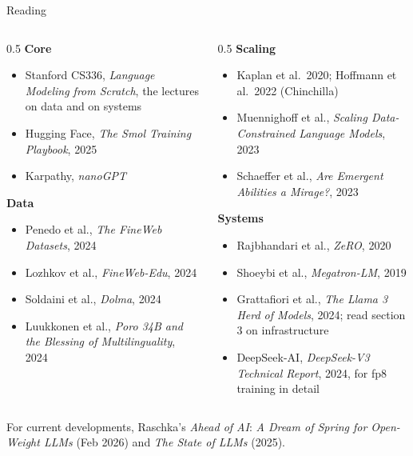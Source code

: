 \documentclass[aspectratio=169,10pt]{beamer}
\begin{document}
\begin{frame}[shrink=18]{Reading}
  \begin{columns}[T]
    \begin{column}{0.5\textwidth}
      \textbf{Core}
      \begin{itemize}\small
        \item Stanford CS336, \textit{Language Modeling from Scratch}, the
          lectures on data and on systems
        \item Hugging Face, \textit{The Smol Training Playbook}, 2025
        \item Karpathy, \textit{nanoGPT}
      \end{itemize}
      \vspace{0.4em}
      \textbf{Data}
      \begin{itemize}\small
        \item Penedo et al., \textit{The FineWeb Datasets}, 2024
        \item Lozhkov et al., \textit{FineWeb-Edu}, 2024
        \item Soldaini et al., \textit{Dolma}, 2024
        \item Luukkonen et al., \textit{Poro 34B and the Blessing of
          Multilinguality}, 2024
      \end{itemize}
    \end{column}
    \begin{column}{0.5\textwidth}
      \textbf{Scaling}
      \begin{itemize}\small
        \item Kaplan et al.\ 2020; Hoffmann et al.\ 2022 (Chinchilla)
        \item Muennighoff et al., \textit{Scaling Data-Constrained Language
          Models}, 2023
        \item Schaeffer et al., \textit{Are Emergent Abilities a Mirage?}, 2023
      \end{itemize}
      \vspace{0.4em}
      \textbf{Systems}
      \begin{itemize}\small
        \item Rajbhandari et al., \textit{ZeRO}, 2020
        \item Shoeybi et al., \textit{Megatron-LM}, 2019
        \item Grattafiori et al., \textit{The Llama 3 Herd of Models}, 2024;
          read section 3 on infrastructure
        \item DeepSeek-AI, \textit{DeepSeek-V3 Technical Report}, 2024, for fp8
          training in detail
      \end{itemize}
    \end{column}
  \end{columns}
  \vspace{0.3em}
  \small
  For current developments, Raschka's \textit{Ahead of AI}:
  \textit{A Dream of Spring for Open-Weight LLMs} (Feb 2026) and
  \textit{The State of LLMs} (2025).
\end{frame}
\end{document}

